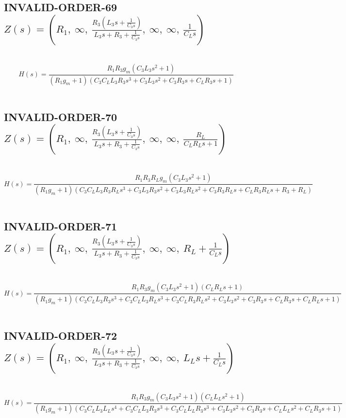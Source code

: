 \documentclass{article}
\begin{document}
\subsection{INVALID-ORDER-69 $Z(s) = \left( R_{1}, \  \infty, \  \frac{R_{3} \left(L_{3} s + \frac{1}{C_{3} s}\right)}{L_{3} s + R_{3} + \frac{1}{C_{3} s}}, \  \infty, \  \infty, \  \frac{1}{C_{L} s}\right)$ } \ 
\textbf{\[H(s) = \frac{R_{1} R_{3} g_{m} \left(C_{3} L_{3} s^{2} + 1\right)}{\left(R_{1} g_{m} + 1\right) \left(C_{3} C_{L} L_{3} R_{3} s^{3} + C_{3} L_{3} s^{2} + C_{3} R_{3} s + C_{L} R_{3} s + 1\right)}\] } \ 
\subsection{INVALID-ORDER-70 $Z(s) = \left( R_{1}, \  \infty, \  \frac{R_{3} \left(L_{3} s + \frac{1}{C_{3} s}\right)}{L_{3} s + R_{3} + \frac{1}{C_{3} s}}, \  \infty, \  \infty, \  \frac{R_{L}}{C_{L} R_{L} s + 1}\right)$ } \ 
\textbf{\[H(s) = \frac{R_{1} R_{3} R_{L} g_{m} \left(C_{3} L_{3} s^{2} + 1\right)}{\left(R_{1} g_{m} + 1\right) \left(C_{3} C_{L} L_{3} R_{3} R_{L} s^{3} + C_{3} L_{3} R_{3} s^{2} + C_{3} L_{3} R_{L} s^{2} + C_{3} R_{3} R_{L} s + C_{L} R_{3} R_{L} s + R_{3} + R_{L}\right)}\] } \ 
\subsection{INVALID-ORDER-71 $Z(s) = \left( R_{1}, \  \infty, \  \frac{R_{3} \left(L_{3} s + \frac{1}{C_{3} s}\right)}{L_{3} s + R_{3} + \frac{1}{C_{3} s}}, \  \infty, \  \infty, \  R_{L} + \frac{1}{C_{L} s}\right)$ } \ 
\textbf{\[H(s) = \frac{R_{1} R_{3} g_{m} \left(C_{3} L_{3} s^{2} + 1\right) \left(C_{L} R_{L} s + 1\right)}{\left(R_{1} g_{m} + 1\right) \left(C_{3} C_{L} L_{3} R_{3} s^{3} + C_{3} C_{L} L_{3} R_{L} s^{3} + C_{3} C_{L} R_{3} R_{L} s^{2} + C_{3} L_{3} s^{2} + C_{3} R_{3} s + C_{L} R_{3} s + C_{L} R_{L} s + 1\right)}\] } \ 
\subsection{INVALID-ORDER-72 $Z(s) = \left( R_{1}, \  \infty, \  \frac{R_{3} \left(L_{3} s + \frac{1}{C_{3} s}\right)}{L_{3} s + R_{3} + \frac{1}{C_{3} s}}, \  \infty, \  \infty, \  L_{L} s + \frac{1}{C_{L} s}\right)$ } \ 
\textbf{\[H(s) = \frac{R_{1} R_{3} g_{m} \left(C_{3} L_{3} s^{2} + 1\right) \left(C_{L} L_{L} s^{2} + 1\right)}{\left(R_{1} g_{m} + 1\right) \left(C_{3} C_{L} L_{3} L_{L} s^{4} + C_{3} C_{L} L_{3} R_{3} s^{3} + C_{3} C_{L} L_{L} R_{3} s^{3} + C_{3} L_{3} s^{2} + C_{3} R_{3} s + C_{L} L_{L} s^{2} + C_{L} R_{3} s + 1\right)}\] } \ 
\end{document}
